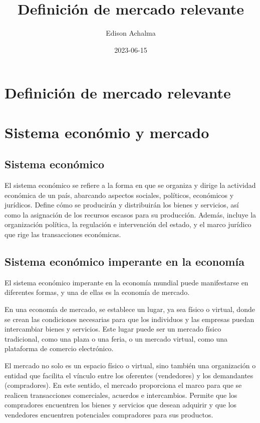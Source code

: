 \documentclass[
  doc,
  floatsintext,
  longtable,
  a4paper,
  nolmodern,
  notxfonts,
  notimes,
  12pt,
  colorlinks=true,linkcolor=blue,citecolor=blue,urlcolor=blue]{apa7}
\title{Definición de mercado relevante}
\author{Edison Achalma}
\affiliation{
{Escuela Profesional de Economía, Universidad Nacional de San Cristóbal
de Huamanga}}
\date{2023-06-15}
\begin{document}
\maketitle


\hypertarget{toc}{}
\tableofcontents
\newpage
\section[Introduction]{Definición de mercado relevante}

\setcounter{secnumdepth}{3}

\setlength\LTleft{0pt}




\section{Sistema económio y
mercado}\label{sistema-econuxf3mio-y-mercado}

\subsection{Sistema económico}\label{sistema-econuxf3mico}

El sistema económico se refiere a la forma en que se organiza y dirige
la actividad económica de un país, abarcando aspectos sociales,
políticos, económicos y jurídicos. Define cómo se producirán y
distribuirán los bienes y servicios, así como la asignación de los
recursos escasos para su producción. Además, incluye la organización
política, la regulación e intervención del estado, y el marco jurídico
que rige las transacciones económicas.

\subsection{Sistema económico imperante en la
economía}\label{sistema-econuxf3mico-imperante-en-la-economuxeda}

El sistema económico imperante en la economía mundial puede manifestarse
en diferentes formas, y una de ellas es la economía de mercado.

En una economía de mercado, se establece un lugar, ya sea físico o
virtual, donde se crean las condiciones necesarias para que los
individuos y las empresas puedan intercambiar bienes y servicios. Este
lugar puede ser un mercado físico tradicional, como una plaza o una
feria, o un mercado virtual, como una plataforma de comercio
electrónico.

El mercado no solo es un espacio físico o virtual, sino también una
organización o entidad que facilita el vínculo entre los oferentes
(vendedores) y los demandantes (compradores). En este sentido, el
mercado proporciona el marco para que se realicen transacciones
comerciales, acuerdos e intercambios. Permite que los compradores
encuentren los bienes y servicios que desean adquirir y que los
vendedores encuentren potenciales compradores para sus productos.
\end{document}
